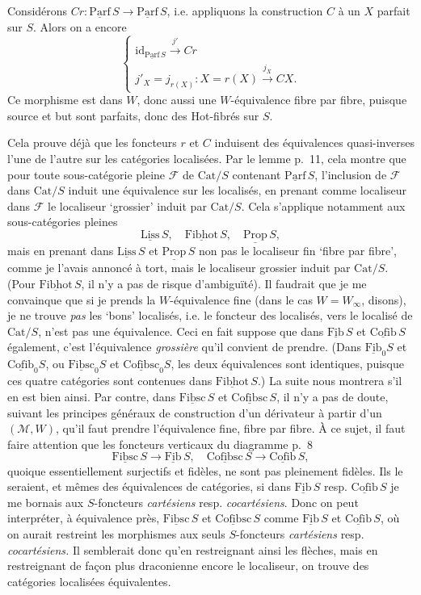 \documentclass[11pt]{article}
\newcommand{\printedpage}[1]{\marginpar{\footnotesize p.~#1}}
\newcommand{\msp}[1]{\marginpar{\footnotesize [#1]}}
\newcommand{\und}[1]{\underline{\mathrm{#1}}}
\newcommand{\Cat}{\mathrm{Cat}}
\begin{document}
Considérons $Cr : \und{Parf}\,S \longrightarrow \und{Parf}\,S$, i.e. appliquons la construction $C$ à un $X$ parfait sur $S$. Alors on a encore
\[
\left\{
\begin{array}{l}
\mathrm{id}_{\und{Parf}\,S} \xrightarrow{j'} Cr \\[1ex]
j'_X = j_{r(X)} : X = r(X) \xrightarrow{j_X} CX.
\end{array}
\right.
\]
Ce morphisme est dans $W$, donc aussi une $W$-équivalence fibre par fibre, puisque source et but sont parfaits, donc des Hot-fibrés sur $S$.

\msp{page 25}
Cela prouve déjà que les foncteurs $r$ et $C$ induisent des équivalences quasi-inverses l'une de l'autre sur les catégories localisées. Par le lemme p.~11, cela montre que pour toute sous-catégorie pleine $\mathcal{F}$ de $\Cat/S$ contenant $\und{Parf}\,S$, l'inclusion de $\mathcal{F}$ dans $\Cat/S$ induit une
\printedpage{16}
équivalence sur les localisés, en prenant comme localiseur dans $\mathcal{F}$ le localiseur `grossier' induit par $\Cat/S$. Cela s'applique notamment aux sous-catégories pleines
\[ \und{Liss}\,S, \quad \und{Fibhot}\,S, \quad \und{Prop}\,S, \]
mais en prenant dans $\und{Liss}\,S$ et $\und{Prop}\,S$ non pas le localiseur fin `fibre par fibre', comme je l'avais annoncé à tort, mais le localiseur grossier induit par $\Cat/S$. (Pour $\und{Fibhot}\,S$, il n'y a pas de risque d'ambiguïté). Il faudrait que je me convainque que si je prends la $W$-équivalence fine (dans le cas $W = W_\infty$, disons), je ne trouve \textit{pas} les `bons' localisés, i.e. le foncteur des localisés, vers le localisé de $\Cat/S$, n'est pas une équivalence. Ceci en fait suppose que dans $\und{Fib}\,S$ et $\und{Cofib}\,S$ également, c'est l'équivalence \textit{grossière}
\msp{page 26}
qu'il convient de prendre. (Dans $\und{Fib}_0S$ et $\und{Cofib}_0S$, ou $\und{Fibsc}_0S$ et $\und{Cofibsc}_0S$, les deux équivalences sont identiques, puisque ces quatre catégories sont contenues dans $\und{Fibhot}\,S$.) La suite nous montrera s'il en est bien ainsi. Par contre, dans $\und{Fibsc}\,S$ et $\und{Cofibsc}\,S$, il n'y a pas de doute, suivant les principes généraux de construction d'un dérivateur à partir d'un $(\mathcal{M}, W)$, qu'il faut prendre l'équivalence fine, fibre par fibre. À ce sujet, il faut faire attention que les foncteurs verticaux du diagramme p.~8
\[ \und{Fibsc}\,S \longrightarrow \und{Fib}\,S, \quad \und{Cofibsc}\,S \longrightarrow \und{Cofib}\,S, \]
quoique essentiellement surjectifs et fidèles, ne sont pas pleinement fidèles. Ils le seraient, et mêmes des équivalences de catégories, si dans $\und{Fib}\,S$ resp. $\und{Cofib}\,S$ je me bornais aux $S$-foncteurs \textit{cartésiens} resp. \textit{cocartésiens}. Donc on peut interpréter, à équivalence près, $\und{Fibsc}\,S$ et $\und{Cofibsc}\,S$ comme $\und{Fib}\,S$ et $\und{Cofib}\,S$, où on aurait restreint les morphismes aux seuls $S$-foncteurs \textit{cartésiens} resp. \textit{cocartésiens.} Il semblerait donc qu'en restreignant ainsi les flèches, mais en restreignant de façon plus draconienne encore le localiseur, on trouve des catégories localisées équivalentes. %
\end{document}
